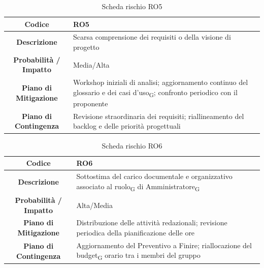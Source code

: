 \begin{table}[H]
	\centering
	\renewcommand{\arraystretch}{1.3}
	\begin{tabularx}{\textwidth}{|c|X|}
		\hline
		\textbf{Codice} & \textbf{RO5} \\
		\hline
		\textbf{Descrizione} & Scarsa comprensione dei requisiti o della visione di progetto \\
		\hline
		\textbf{Probabilità / Impatto} & Media/Alta \\
		\hline
		\textbf{Piano di Mitigazione} & Workshop iniziali di analisi; aggiornamento continuo del glossario e dei casi d'uso\textsubscript{G}; confronto periodico con il proponente \\
		\hline
		\textbf{Piano di Contingenza} & Revisione straordinaria dei requisiti; riallineamento del backlog e delle priorità progettuali \\
		\hline
	\end{tabularx}
	\caption{Scheda rischio RO5}
\end{table}

\begin{table}[H]
	\centering
	\renewcommand{\arraystretch}{1.3}
	\begin{tabularx}{\textwidth}{|c|X|}
		\hline
		\textbf{Codice} & \textbf{RO6} \\
		\hline
		\textbf{Descrizione} & Sottostima del carico documentale e organizzativo associato al ruolo\textsubscript{G} di Amministratore\textsubscript{G} \\
		\hline
		\textbf{Probabilità / Impatto} & Alta/Media \\
		\hline
		\textbf{Piano di Mitigazione} & Distribuzione delle attività redazionali; revisione periodica della pianificazione delle ore \\
		\hline
		\textbf{Piano di Contingenza} & Aggiornamento del Preventivo a Finire; riallocazione del budget\textsubscript{G} orario tra i membri del gruppo \\
		\hline
	\end{tabularx}
	\caption{Scheda rischio RO6}
\end{table}


